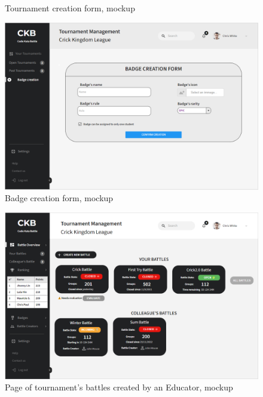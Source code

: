 \documentclass{article}
\begin{document}
{\begin{figure}[H]
    \caption{Tournament creation form, mockup}
    \label{fig:tournamentCreationPageMockup}
\end{figure}
\begin{figure}[H]
    \centering
    \hspace*{-0.2cm}\includegraphics[scale=0.52]{UserInterface/BadgeCreation.png}
    \caption{Badge creation form, mockup}
    \label{fig:badgeCreationPageMockup}
\end{figure}
\begin{figure}[H]
    \centering
    \hspace*{-0.2cm}\includegraphics[scale=0.52]{UserInterface/EducatorBattles.png}
    \caption{Page of tournament's battles created by an Educator, mockup}
    \label{fig:tournamentManagementPageMockup}
\end{figure}
\begin{figure}[H]
    \centering

\end{figure}}
\end{document}
